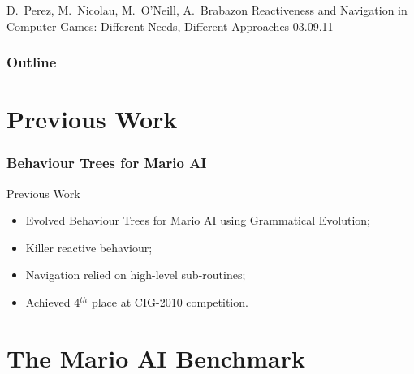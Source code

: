 \documentclass{beamer}
\begin{document}
\begin{caslgraphframe}
\end{caslgraphframe}

\begin{titleframe}
{D.~Perez, M.~Nicolau, M.~O'Neill, A.~Brabazon}
{Reactiveness and Navigation in Computer Games: Different Needs, Different Approaches}
{03.09.11}
\end{titleframe}


\begin{frame}{}
	\frametitle{Outline}
	\tableofcontents
\end{frame}

\section{Previous Work}

\begin{frame}{}
	\frametitle{Behaviour Trees for Mario AI}
	\begin{block}{Previous Work}
		\begin{itemize}
			\item Evolved Behaviour Trees for Mario AI using Grammatical Evolution;
			\item Killer reactive behaviour;
			\item Navigation relied on high-level sub-routines;
			\item Achieved 4$^{th}$ place at CIG-2010 competition.
		\end{itemize}
	\end{block}
	\vfill
\end{frame}

\section{The Mario AI Benchmark}
\end{document}

